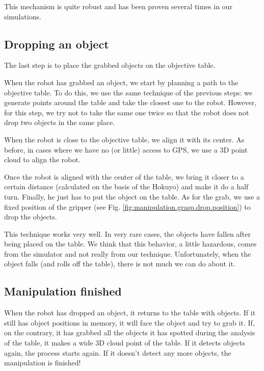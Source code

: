 \documentclass[a4paper, 10pt, conference]{ieeeconf}
\begin{document}
    This mechanism is quite robust and has been proven several times in our simulations.
    
    \subsection{Dropping an object}
    
    The last step is to place the grabbed objects on the objective table.
    
    When the robot has grabbed an object, we start by planning a path to the objective table. To do this, we use the same technique of the previous steps: we generate points around the table and take the closest one to the robot. However, for this step, we try not to take the same one twice so that the robot does not drop two objects in the same place.
    
    When the robot is close to the objective table, we align it with its center. As before, in cases where we have no (or little) access to GPS, we use a 3D point cloud to align the robot.
    
    Once the robot is aligned with the center of the table, we bring it closer to a certain distance (calculated on the basis of the Hokuyo) and make it do a half turn. Finally, he just has to put the object on the table. As for the grab, we use a fixed position of the gripper (see Fig. \ref{fig:manipulation.grasp.drop.position}) to drop the objects.
    
    This technique works very well. In very rare cases, the objects have fallen after being placed on the table. We think that this behavior, a little hazardous, comes from the simulator and not really from our technique. Unfortunately, when the object falls (and rolls off the table), there is not much we can do about it.
    
    \subsection{Manipulation finished}
    
    When the robot has dropped an object, it returns to the table with objects. If it still has object positions in memory, it will face the object and try to grab it. If, on the contrary, it has grabbed all the objects it has spotted during the analysis of the table, it makes a wide 3D cloud point of the table. If it detects objects again, the process starts again. If it doesn't detect any more objects, the manipulation is finished!
    
\end{document}
